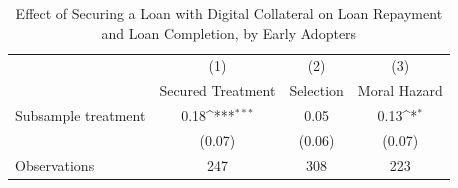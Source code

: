 \begin{table}[htbp]\centering
\def\sym#1{\ifmmode^{#1}\else\(^{#1}\)\fi}
\caption{Effect of Securing a Loan with Digital Collateral on Loan Repayment and Loan Completion, by Early Adopters\label{LASMH\_complete\_earlyadopt\_ITT\_150}}
\begin{tabular}{l*{3}{c}}
\toprule
                    &\multicolumn{1}{c}{(1)}&\multicolumn{1}{c}{(2)}&\multicolumn{1}{c}{(3)}\\
                    &\multicolumn{1}{c}{Secured Treatment}&\multicolumn{1}{c}{Selection}&\multicolumn{1}{c}{Moral Hazard}\\
\midrule
Subsample treatment &        0.18\sym{***}&        0.05         &        0.13\sym{*}  \\
                    &      (0.07)         &      (0.06)         &      (0.07)         \\
\midrule
Observations        &         247         &         308         &         223         \\
\bottomrule
\end{tabular}
\end{table}
